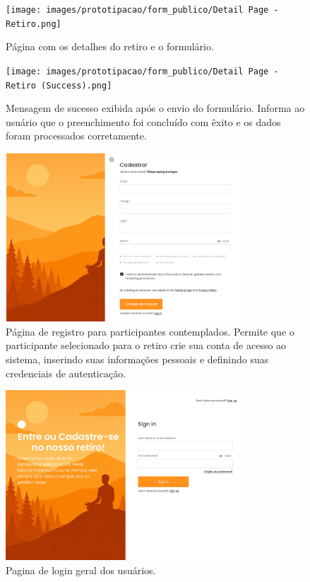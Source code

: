 \begin{figure}[H]
\centering
\texttt{[image: images/prototipacao/form\_publico/Detail Page - Retiro.png]}
\caption{Página com os detalhes do retiro e o formulário.}
\end{figure}

\begin{figure}[H]
\centering
\texttt{[image: images/prototipacao/form\_publico/Detail Page - Retiro (Success).png]}
\caption{Mensagem de sucesso exibida após o envio do formulário. Informa ao usuário que o preenchimento foi concluído com êxito e os dados foram processados corretamente.}
\end{figure}

\begin{figure}[H]
\centering
\includegraphics[width=0.8\textwidth]{images/prototipacao/participant_login/register.png}
\caption{Página de registro para participantes contemplados. Permite que o participante selecionado para o retiro crie sua conta de acesso ao sistema, inserindo suas informações pessoais e definindo suas credenciais de autenticação.}
\end{figure}

\begin{figure}[H]
\centering
\includegraphics[width=0.8\textwidth]{images/prototipacao/participant_login/login.png}
\caption{Pagina de login geral dos usuários.}
\end{figure}


